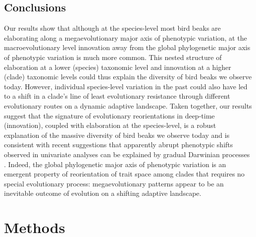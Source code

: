 \documentclass[12pt,letterpaper]{article}
\begin{document}
\subsection{Conclusions}

Our results show that although at the species-level most bird beaks are elaborating along a megaevolutionary major axis of phenotypic variation, at the macroevolutionary level innovation away from the global phylogenetic major axis of phenotypic variation is much more common. 
This nested structure of elaboration at a lower (species) taxonomic level and innovation at a higher (clade) taxonomic levels could thus explain the diversity of bird beaks we observe today.
However, individual species-level variation in the past could also have led to a shift in a clade's line of least evolutionary resistance through different evolutionary routes on a dynamic adaptive landscape. 
Taken together, our results suggest that the signature of evolutionary reorientations in deep-time (innovation), coupled with elaboration at the species-level, is a robust explanation of the massive diversity of bird beaks we observe today and is consistent with recent suggestions that apparently abrupt phenotypic shifts observed in univariate analyses can be explained by gradual Darwinian processes \cite{pagel2022general, BurinWhales}\cite{pagel2022general}.
Indeed, the global phylogenetic major axis of phenotypic variation is an emergent property of reorientation of trait space among clades that requires no special evolutionary process: megaevolutionary patterns appear to be an inevitable outcome of evolution on a shifting adaptive landscape. 



\section{Methods}
\end{document}

